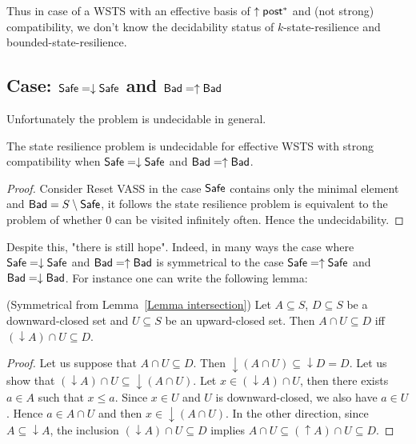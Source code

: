 Thus in case of a WSTS with an effective basis of $\uparrow \textsf{post}^*$ and (not strong) compatibility, we don't know the decidability status of $k$-state-resilience and bounded-state-resilience. 


\subsection{Case: $\textsf{Safe} = \downarrow \textsf{Safe}$ and $\textsf{Bad} = \uparrow \textsf{Bad}$}



Unfortunately the problem is undecidable in general.

\begin{theorem}
The state resilience problem is undecidable for effective WSTS with  strong  compatibility 
when
$\textsf{Safe}=\downarrow \textsf{Safe}$
and $\textsf{Bad}=\uparrow \textsf{Bad}$.
\end{theorem}

\begin{proof}
Consider Reset VASS
in the case $\textsf{Safe}$ contains only the minimal element %
and $\textsf{Bad} = S \setminus \textsf{Safe}$, 
it follows the state resilience problem is equivalent 
to the problem of whether $0$ can be visited infinitely often. 
%
Hence the undecidability.
\end{proof}


Despite this, "there is still hope". Indeed, in many ways the case where $\textsf{Safe} = \downarrow \textsf{Safe}$ and $\textsf{Bad} = \uparrow \textsf{Bad}$
is symmetrical to the case $\textsf{Safe} = \uparrow \textsf{Safe}$ and $\textsf{Bad} = \downarrow \textsf{Bad}$.
%
For instance one can write the following lemma:

\begin{lemma}(Symmetrical from Lemma~\ref{Lemma intersection})\label{Lemma intersection 2}
Let $A \subseteq S$, $D \subseteq S$ be a downward-closed set and $U \subseteq S$ be an upward-closed set. 
Then $A \cap U \subseteq D$  iff $ (\downarrow  A) \cap U \subseteq D$.
\end{lemma}


\begin{proof}
Let us suppose that $A \cap U \subseteq D$. Then ${\downarrow (A \cap U)} \subseteq {\downarrow D} = D$.
Let us show that $({\downarrow A}) \cap U \subseteq {\downarrow (A \cap U)}$.
Let $x \in ({\downarrow A}) \cap U$, then there exists $a \in A$ such that $x \leq a$.
Since $x \in U$ and $U$ is downward-closed, we also have $a \in U$.
Hence $a \in A \cap U$ and then $x \in { \downarrow (A \cap U)}$.
In the other direction,
since $A \subseteq {\downarrow A}$, the inclusion
$({\downarrow  A}) \cap U \subseteq D$ implies
$A \cap U \subseteq ({\uparrow  A}) \cap U \subseteq D$.
\end{proof}


